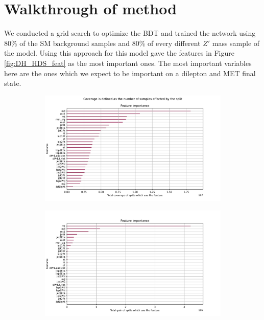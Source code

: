 \documentclass[12pt, a4paper]{book}
\begin{document}
\section{Walkthrough of method}\label{sec:Walkthrough}
We conducted a grid search to optimize the BDT and trained the network using 80\% of the SM background samples and 80\% of every different $Z'$ mass sample of the model. Using this approach for this model gave the features in Figure \ref{fig:DH_HDS_feat} as the most important ones. The most important variables here are the ones which we expect 
to be important on a dilepton and MET final state.\\
\begin{figure}[!ht]
	\centering
	\begin{subfigure}[b]{0.7\textwidth}
      \centering
      \includegraphics[width=1\textwidth]{XGBoost/DH_HDS/feature_importance/total_cover.pdf}
      \end{subfigure}
      \hfill
      \begin{subfigure}[b]{0.7\textwidth}
         \centering
         \includegraphics[width=1\textwidth]{XGBoost/DH_HDS/feature_importance/total_gain.pdf}

\end{subfigure}
\end{figure}
\end{document}
